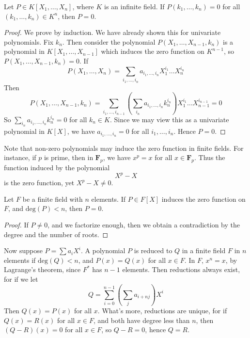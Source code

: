 \begin{corollary}
    Let $P \in K[X_1, \dots, X_n]$, where $K$ is an infinite field. If $P(k_1, \dots, k_n) = 0$ for all $(k_1, \dots, k_n) \in K^n$, then $P = 0$.
\end{corollary}
\begin{proof}
    We prove by induction. We have already shown this for univariate polynomials. Fix $k_n$. Then consider the polynomial $P(X_1, \dots, X_{n-1}, k_n)$ is a polynomial in $K[X_1, \dots, X_{n-1}]$ which induces the zero function on $K^{n-1}$, so $P(X_1, \dots, X_{n-1}, k_n) = 0$. If
    \[ P(X_1, \dots, X_n) = \sum_{i_1, \dots, i_n} a_{i_1, \dots, i_n} X_1^{i_1} \dots X_n^{i_n} \]
    Then
    \[ P(X_1, \dots, X_{n-1}, k_n) = \sum_{i_1, \dots, i_{n-1}} \left(\sum_{i_n} a_{i_1, \dots, i_n} k_n^{i_n} \right) X_1^{i_1} \dots X_{n-1}^{i_{n-1}} = 0 \]
    So $\sum_{i_n} a_{i_1, \dots, i_n} k_n^{i_n} = 0$ for all $k_n \in K$. Since we may view this as a univariate polynomial in $K[X]$, we have $a_{i_1, \dots, i_n} = 0$ for all $i_1, \dots, i_n$. Hence $P = 0$.
\end{proof}

Note that non-zero polynomials may induce the zero function in finite fields. For instance, if $p$ is prime, then in $\mathbf{F}_p$, we have $x^p = x$ for all $x \in \mathbf{F}_p$. Thus the function induced by the polynomial
%
\[ X^p - X \]
%
is the zero function, yet $X^p - X \neq 0$.

\begin{lemma}
    Let $F$ be a finite field with $n$ elements. If $P \in F[X]$ induces the zero function on $F$, and $\text{deg}(P) < n$, then $P = 0$.
\end{lemma}
\begin{proof}
    If $P \neq 0$, and we factorize enough, then we obtain a contradiction by the degree and the number of roots.
\end{proof}

Now suppose $P = \sum a_i X^i$. A polynomial $P$ is reduced to $Q$ in a finite field $F$ in $n$ elements if $\text{deg}(Q) < n$, and $P(x) = Q(x)$ for all $x \in F$. In $F$, $x^n = x$, by Lagrange's theorem, since $F^*$ has $n-1$ elements. Then reductions always exist, for if we let
%
\[ Q = \sum_{i = 0}^{n-1} \left( \sum_j a_{i + nj} \right) X^i \]
%
Then $Q(x) = P(x)$ for all $x$. What's more, reductions are unique, for if $Q(x) = R(x)$ for all $x \in F$, and both have degree less than $n$, then $(Q - R)(x) = 0$ for all $x \in F$, so $Q - R = 0$, hence $Q = R$.






